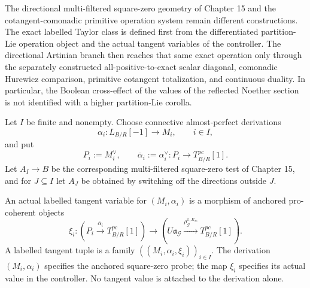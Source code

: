 The directional multi-filtered square-zero geometry of Chapter 15 and the
cotangent-comonadic primitive operation system remain different constructions.
The exact labelled Taylor class is defined first from the differentiated
partition-Lie operation object and the actual tangent variables of the controller.
The directional Artinian branch then reaches that same exact operation only through
the separately constructed all-positive-to-exact scalar diagonal, comonadic
Hurewicz comparison, primitive cotangent totalization, and continuous duality.
In particular, the Boolean cross-effect of the values of the reflected Noether
section is not identified with a higher partition-Lie corolla.

Let $I$ be finite and nonempty.  Choose connective almost-perfect derivations
\[
\alpha_i:L_{B/R}[-1]\longrightarrow M_i,
\qquad i\in I,
\]
and put
\[
P_i:=M_i^\vee,
\qquad
\bar\alpha_i:=\alpha_i^\vee:
P_i\longrightarrow T^{pc}_{B/R}[1].
\]
Let $A_I\to B$ be the corresponding multi-filtered square-zero test of Chapter 15,
and for $J\subseteq I$ let $A_J$ be obtained by switching off the directions
outside $J$.

\begin{definition}
\label{def:symmetry-noether-actual-labelled-tangent-variables}
An actual labelled tangent variable for $(M_i,\alpha_i)$ is a morphism of anchored
pro-coherent objects
\[
\boxed{
\xi_i:
\left(
P_i\xrightarrow{\bar\alpha_i}T^{pc}_{B/R}[1]
\right)
\longrightarrow
\left(
U\mathfrak a_{\mathcal G}
\xrightarrow{\rho_{\mathcal G}^{\pi,E_\infty}}
T^{pc}_{B/R}[1]
\right).
}
\]
A labelled tangent tuple is a family
$((M_i,\alpha_i,\xi_i))_{i\in I}$.
The derivation $(M_i,\alpha_i)$ specifies the anchored square-zero probe; the map
$\xi_i$ specifies its actual value in the controller.  No tangent value is attached
to the derivation alone.
\end{definition}

